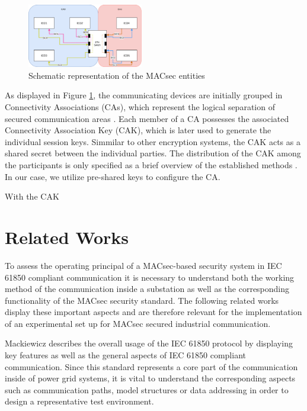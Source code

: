 \documentclass[conference]{IEEEtran}
\begin{document}
\begin{figure}[h]
    \centering
    \includegraphics[width=0.45\textwidth]{images/MACsec_Entities_Diagram.png}
    \caption{Schematic representation of the MACsec entities \cite{IEEE-802-1AE:2018}}
    \label{image:MACsecEntities}
\end{figure}

As displayed in Figure \ref{image:MACsecEntities}, the communicating devices are initially grouped in Connectivity Associations (CAs), which represent 
the logical separation of secured communication areas \cite[p. 35]{IEEE-802-1AE:2018}. Each member of a CA possesses the associated Connectivity 
Association Key (CAK), which is later used to generate the individual session keys. Simmilar to other encryption systems, the CAK acts as a shared 
secret between the individual parties. The distribution of the CAK among the participants is only specified as a brief overview of the established 
methods \cite[p. 230]{IEEE-802-1AE:2018}. In our case, we utilize pre-shared keys to configure the CA.

\smallskip
With the CAK

\section{Related Works}
\label{chapter:relatedWork}
\noindent To assess the operating principal of a MACsec-based security system in IEC 61850 compliant communication it is necessary to understand both 
the working method of the communication inside a substation as well as the corresponding functionality of the MACsec security standard. The following 
related works display these important aspects and are therefore relevant for the implementation of an experimental set up for MACsec secured industrial 
communication.

\smallskip
Mackiewicz \cite{IEC61850_Overview:2006} describes the overall usage of the IEC 61850 protocol by displaying key features as well as the general aspects 
of IEC 61850 compliant communication. Since this standard represents a core part of the communication inside of power grid systems, it is vital to 
understand the corresponding aspects such as communication paths, model structures or data addressing in order to design a representative test environment. 
\end{document}
